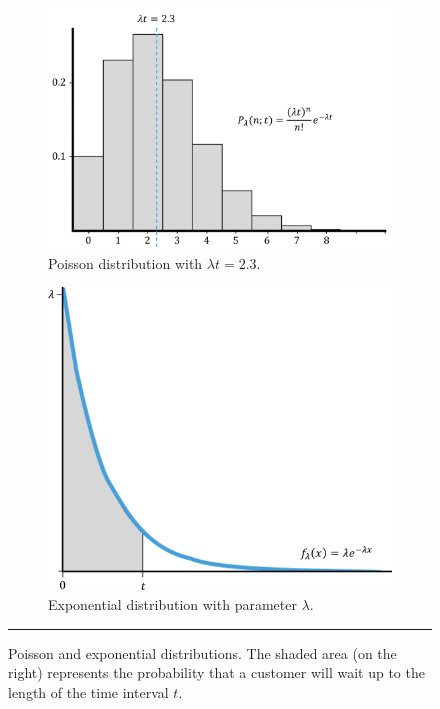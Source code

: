 \begin{figure}[!t]
\centering
\begin{subfigure}[b]{0.45\textwidth}
\centering\includegraphics[height=0.25\textheight]{images/QSD/poisson.png}
\caption{\small Poisson distribution with $\lambda t=2.3$.}
\label{fig:dist1P}
\end{subfigure}
\begin{subfigure}[b]{0.45\textwidth}
\centering\includegraphics[height=0.25\textheight]{images/QSD/exp.png}
\caption{\small Exponential distribution with parameter $\lambda$.}
\label{fig:dist1E}
\end{subfigure}
\caption[\small Poisson and exponential distributions]{\small Poisson and exponential distributions. The shaded area (on the right) represents the probability that a customer will wait up to the length of the time interval $t$.}\label{fig:dist1}\hrule
\end{figure}
